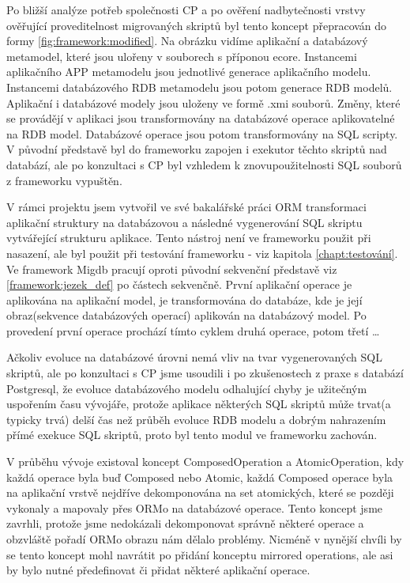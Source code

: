 \documentclass[11pt,twoside,a4paper]{book}
\begin{document}
Po bližší analýze potřeb společnosti CP a po ověření nadbytečnosti vrstvy
ověřující proveditelnost migrovaných skriptů byl tento koncept přepracován do
formy \ref{fig:framework:modified}. Na obrázku vidíme aplikační a databázový
metamodel, které jsou ulořeny v souborech s příponou ecore. Instancemi
aplikačního APP metamodelu jsou jednotlivé generace aplikačního modelu. 
Instancemi databázového RDB metamodelu jsou potom generace RDB modelů. Aplikační
i databázové modely jsou uloženy ve formě .xmi souborů.  Změny, které se
provádějí v aplikaci jsou transformovány na databázové operace aplikovatelné na
RDB model. Databázové operace jsou potom transformovány na SQL scripty. V
původní představě byl do frameworku zapojen i exekutor těchto skriptů nad
databází, ale po konzultaci s CP byl vzhledem k znovupoužitelnosti SQL souborů
z frameworku vypuštěn. 

V rámci projektu jsem vytvořil ve své bakalářské práci \cite{Lukes} ORM
transformaci aplikační struktury na databázovou a následné vygenerování SQL
skriptu vytvářející strukturu aplikace. Tento nástroj není ve frameworku použit
při nasazení, ale byl použit při testování frameworku - viz
kapitola \ref{chapt:testování}. Ve framework Migdb pracují
oproti původní sekvenční představě viz \ref{framework:jezek_def} po částech
sekvenčně. První aplikační operace je aplikována na aplikační model, je
transformována do databáze, kde je její obraz(sekvence databázových operací)
aplikován na databázový model. Po provedení první operace prochází tímto
cyklem druhá operace, potom třetí \ldots

Ačkoliv evoluce na databázové úrovni nemá vliv na tvar vygenerovaných SQL
skriptů, ale po konzultaci s CP jsme usoudili i po zkušenostech z praxe s
databází Postgresql, že evoluce databázového modelu odhalující chyby je
užitečným uspořením času vývojáře, protože aplikace některých SQL skriptů může
trvat(a typicky trvá) delší čas než průběh evoluce RDB modelu a dobrým
nahrazením přímé exekuce SQL skriptů, proto byl tento modul ve frameworku
zachován.

V průběhu vývoje existoval koncept ComposedOperation a AtomicOperation, kdy
každá operace byla buď Composed nebo Atomic, každá Composed operace byla na
aplikační vrstvě nejdříve dekomponována na set atomických, které se později
vykonaly a mapovaly přes ORMo na databázové operace. Tento koncept jsme zavrhli,
protože jsme nedokázali dekomponovat správně některé operace a obzvláště
pořadí ORMo obrazu nám dělalo problémy. Nicméně v nynější chvíli by se tento
koncept mohl navrátit po přidání konceptu mirrored operations, ale asi by bylo
nutné předefinovat či přidat některé aplikační operace.
\end{document}
